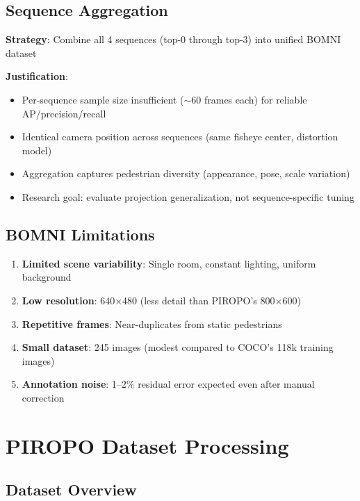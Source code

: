 \documentclass[11pt]{article}
\begin{document}
\subsection{Sequence Aggregation}

\textbf{Strategy}: Combine all 4 sequences (top-0 through top-3) into unified BOMNI dataset

\textbf{Justification}:
\begin{itemize}[leftmargin=*]
    \item Per-sequence sample size insufficient ($\sim$60 frames each) for reliable AP/precision/recall
    \item Identical camera position across sequences (same fisheye center, distortion model)
    \item Aggregation captures pedestrian diversity (appearance, pose, scale variation)
    \item Research goal: evaluate projection generalization, not sequence-specific tuning
\end{itemize}

\subsection{BOMNI Limitations}

\begin{enumerate}[leftmargin=*]
    \item \textbf{Limited scene variability}: Single room, constant lighting, uniform background
    \item \textbf{Low resolution}: 640$\times$480 (less detail than PIROPO's 800$\times$600)
    \item \textbf{Repetitive frames}: Near-duplicates from static pedestrians
    \item \textbf{Small dataset}: 245 images (modest compared to COCO's 118k training images)
    \item \textbf{Annotation noise}: 1--2\% residual error expected even after manual correction
\end{enumerate}

\section{PIROPO Dataset Processing}

\subsection{Dataset Overview}
\end{document}
